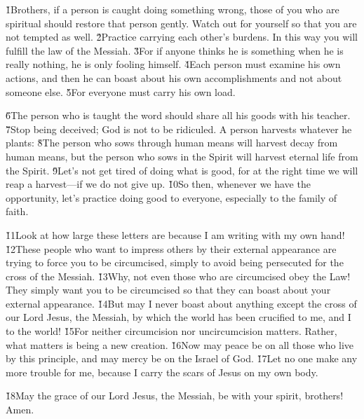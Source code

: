 \v{1}Brothers, if a person is caught doing something wrong, those of you who are spiritual should restore that person gently. Watch out for yourself so that you are not tempted as well. \v{2}Practice carrying each other's burdens. In this way you will fulfill the law of the Messiah. \v{3}For if anyone thinks he is something when he is really nothing, he is only fooling himself. \v{4}Each person must examine his own actions, and then he can boast about his own accomplishments and not about someone else. \v{5}For everyone must carry his own load.

\v{6}The person who is taught the word should share all his goods with his teacher. \v{7}Stop being deceived; God is not to be ridiculed. A person harvests whatever he plants: \v{8}The person who sows through human means will harvest decay from human means, but the person who sows in the Spirit will harvest eternal life from the Spirit. \v{9}Let's not get tired of doing what is good, for at the right time we will reap a harvest---if we do not give up. \v{10}So then, whenever we have the opportunity, let's practice doing good to everyone, especially to the family of faith.

\v{11}Look at how large these letters are because I am writing with my own hand! \v{12}These people who want to impress others by their external appearance are trying to force you to be circumcised, simply to avoid being persecuted for the cross of the Messiah. \v{13}Why, not even those who are circumcised obey the Law! They simply want you to be circumcised so that they can boast about your external appearance. \v{14}But may I never boast about anything except the cross of our Lord Jesus, the Messiah, by which the world has been crucified to me, and I to the world! \v{15}For neither circumcision nor uncircumcision matters. Rather, what matters is being a new creation. \v{16}Now may peace be on all those who live by this principle, and may mercy be on the Israel of God. \v{17}Let no one make any more trouble for me, because I carry the scars of Jesus on my own body.

\v{18}May the grace of our Lord Jesus, the Messiah, be with your spirit, brothers! Amen.
